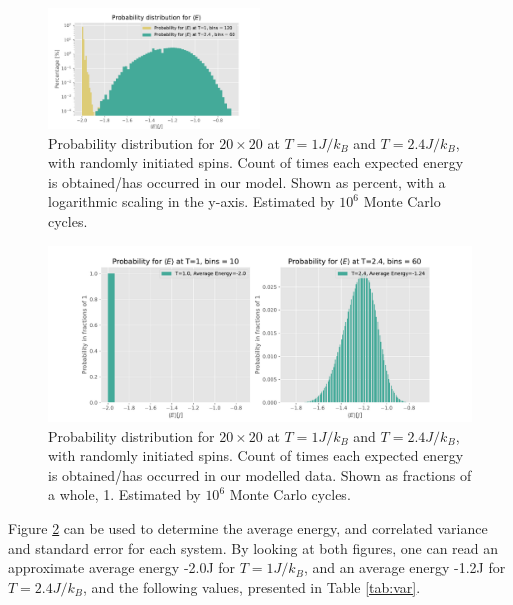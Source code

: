 \documentclass[10pt, nofootinbib, twocolumn]{revtex4-1}
\begin{document}
\begin{figure}[H]
    \centering
    \includegraphics[width = 0.5\textwidth]{figures/20x20prob.pdf} 
    \caption{Probability distribution for $20\times 20$ at $T=1J/k_B$ and $T=2.4J/k_B$, with randomly initiated spins. Count of times each expected energy is obtained/has occurred in our model. Shown as percent, with a logarithmic scaling in the y-axis. Estimated by $10^6$ Monte Carlo cycles.}
    \label{fig:perc}
\end{figure} 
\begin{figure}
    \centering
    \includegraphics[width = 1\textwidth]{figures/20x20probweighted.pdf} 
    \caption{Probability distribution for $20\times 20$ at $T=1J/k_B$ and $T=2.4J/k_B$, with randomly initiated spins. Count of times each expected energy is obtained/has occurred in our modelled data. Shown as fractions of a whole, 1. Estimated by $10^6$ Monte Carlo cycles.}
    \label{fig:frac}
\end{figure} 
\newpage
Figure \ref{fig:frac} can be used to determine the average energy, and correlated variance and standard error for each system. By looking at both figures, one can read an approximate average energy -2.0J for $T=1J/k_B$, and an average energy -1.2J for $T=2.4J/k_B$, and the following values, presented in Table \ref{tab:var}.
\end{document}
